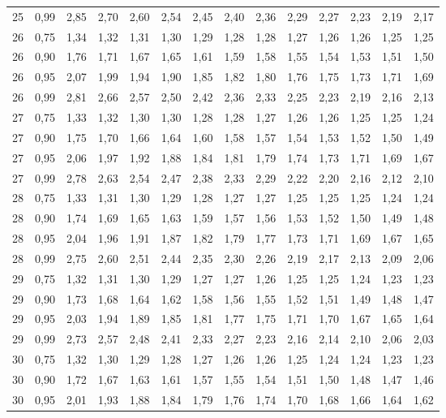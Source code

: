 \documentclass[
]{article}
\begin{document}
\begin{landscape}
\begin{longtable}[t]{cccccccccccccc}
25 & 0,99 & 2,85 & 2,70 & 2,60 & 2,54 & 2,45 & 2,40 & 2,36 & 2,29 & 2,27 & 2,23 & 2,19 & 2,17\\
26 & 0,75 & 1,34 & 1,32 & 1,31 & 1,30 & 1,29 & 1,28 & 1,28 & 1,27 & 1,26 & 1,26 & 1,25 & 1,25\\
26 & 0,90 & 1,76 & 1,71 & 1,67 & 1,65 & 1,61 & 1,59 & 1,58 & 1,55 & 1,54 & 1,53 & 1,51 & 1,50\\
26 & 0,95 & 2,07 & 1,99 & 1,94 & 1,90 & 1,85 & 1,82 & 1,80 & 1,76 & 1,75 & 1,73 & 1,71 & 1,69\\
26 & 0,99 & 2,81 & 2,66 & 2,57 & 2,50 & 2,42 & 2,36 & 2,33 & 2,25 & 2,23 & 2,19 & 2,16 & 2,13\\
27 & 0,75 & 1,33 & 1,32 & 1,30 & 1,30 & 1,28 & 1,28 & 1,27 & 1,26 & 1,26 & 1,25 & 1,25 & 1,24\\
27 & 0,90 & 1,75 & 1,70 & 1,66 & 1,64 & 1,60 & 1,58 & 1,57 & 1,54 & 1,53 & 1,52 & 1,50 & 1,49\\
27 & 0,95 & 2,06 & 1,97 & 1,92 & 1,88 & 1,84 & 1,81 & 1,79 & 1,74 & 1,73 & 1,71 & 1,69 & 1,67\\
27 & 0,99 & 2,78 & 2,63 & 2,54 & 2,47 & 2,38 & 2,33 & 2,29 & 2,22 & 2,20 & 2,16 & 2,12 & 2,10\\
28 & 0,75 & 1,33 & 1,31 & 1,30 & 1,29 & 1,28 & 1,27 & 1,27 & 1,25 & 1,25 & 1,25 & 1,24 & 1,24\\
28 & 0,90 & 1,74 & 1,69 & 1,65 & 1,63 & 1,59 & 1,57 & 1,56 & 1,53 & 1,52 & 1,50 & 1,49 & 1,48\\
28 & 0,95 & 2,04 & 1,96 & 1,91 & 1,87 & 1,82 & 1,79 & 1,77 & 1,73 & 1,71 & 1,69 & 1,67 & 1,65\\
28 & 0,99 & 2,75 & 2,60 & 2,51 & 2,44 & 2,35 & 2,30 & 2,26 & 2,19 & 2,17 & 2,13 & 2,09 & 2,06\\
29 & 0,75 & 1,32 & 1,31 & 1,30 & 1,29 & 1,27 & 1,27 & 1,26 & 1,25 & 1,25 & 1,24 & 1,23 & 1,23\\
29 & 0,90 & 1,73 & 1,68 & 1,64 & 1,62 & 1,58 & 1,56 & 1,55 & 1,52 & 1,51 & 1,49 & 1,48 & 1,47\\
29 & 0,95 & 2,03 & 1,94 & 1,89 & 1,85 & 1,81 & 1,77 & 1,75 & 1,71 & 1,70 & 1,67 & 1,65 & 1,64\\
29 & 0,99 & 2,73 & 2,57 & 2,48 & 2,41 & 2,33 & 2,27 & 2,23 & 2,16 & 2,14 & 2,10 & 2,06 & 2,03\\
30 & 0,75 & 1,32 & 1,30 & 1,29 & 1,28 & 1,27 & 1,26 & 1,26 & 1,25 & 1,24 & 1,24 & 1,23 & 1,23\\
30 & 0,90 & 1,72 & 1,67 & 1,63 & 1,61 & 1,57 & 1,55 & 1,54 & 1,51 & 1,50 & 1,48 & 1,47 & 1,46\\
30 & 0,95 & 2,01 & 1,93 & 1,88 & 1,84 & 1,79 & 1,76 & 1,74 & 1,70 & 1,68 & 1,66 & 1,64 & 1,62\\

\end{longtable}
\end{landscape}
\end{document}
